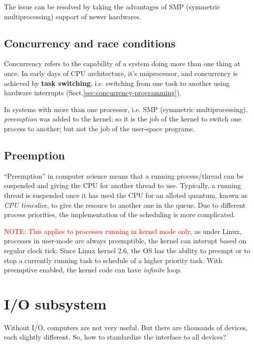 The issue can be resolved by taking the advantages of SMP (symmetric
multiprocessing) support of newer hardwares. 


    
\subsection{Concurrency and race conditions}

Concurrency refers to the capability of a system doing more than one thing at
once. In early days of CPU architecture, it's uniprocessor, and concurrency is
achieved by {\bf task switching}, i.e. switching from one task to another using
hardware interrupts (Sect.\ref{sec:concurrency-programming}).

In systems with more than one processor, i.e. SMP (symmetric multiprocessing).
{\it preemption} was added to the kernel; so it is the job of the kernel to
switch one process to another; but not the job of the user-space programs.



\subsection{Preemption}
\label{sec:preemption}

``Preemption'' in computer science means that a running process/thread can be
suspended and giving the CPU for another thread to use. Typically, a running
thread is suspended once it has used the CPU for an alloted quantum, known as
{\it CPU timeslice}, to give the resouce to another one in the queue. Due to
different process priorities, the implementation of the scheduling is more
complicated.


\textcolor{red}{NOTE: This applies to processes running in kernel mode only}, as
under Linux, processes in user-mode are always preemptible, the kernel can
interupt based on regular clock tick. Since Linux kernel 2.6, the OS has the
ability to preempt or to stop a currently running task to schedule of a higher
priority task. 
With preemptive enabled, the kernel code can have {\it infinite} loop.




\section{I/O subsystem}
\label{sec:I/O-subsystem}

Without I/O, computers are not very useful. But there are thousands of devices,
each slightly different. So, how to standardize the interface to all devices?

